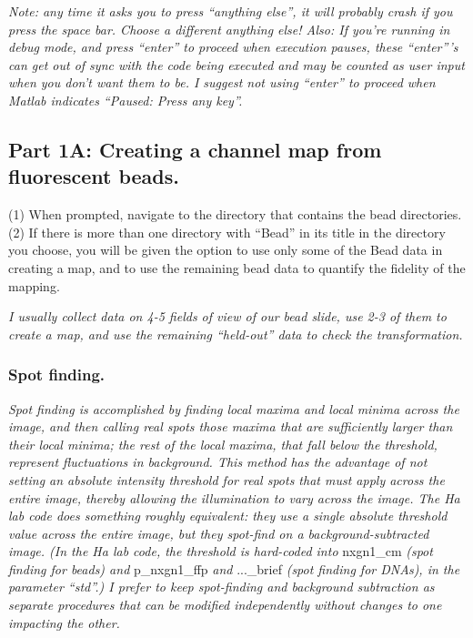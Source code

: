 \documentclass[11pt]{article}
\newcommand{\sj}[1]{\textcolor{red}{#1}}
\begin{document}
{\it Note: any time it asks you to press ``anything else'', it will probably crash if you press the space bar. Choose a different anything else!  Also: If you're running in debug mode, and press ``enter'' to proceed when execution pauses, these ``enter'''s can get out of sync with the code being executed and may be counted as user input when you don't want them to be.  I suggest not using ``enter'' to proceed when Matlab indicates ``Paused: Press any key''.}

\subsection{Part 1A: Creating a channel map from fluorescent beads.}

(1) When prompted, navigate to the directory that contains the bead directories. \\

\noindent (2) If there is more than one directory with ``Bead'' in its title in the directory you choose, you will be given the option to use only some of the Bead data in creating a map, and to use the remaining bead data to quantify the fidelity of the mapping. 

{\it I usually collect data on 4-5 fields of view of our bead slide, use 2-3 of them to create a map, and use the remaining ``held-out'' data to check the transformation. }%

\subsubsection{Spot finding.}\label{sec:SptFindBds}

{\it Spot finding is accomplished by finding local maxima and local minima across the image, and then calling real spots those maxima that are sufficiently larger than their local minima; the rest of the local maxima, that fall below the threshold, represent fluctuations in background.  This method has the advantage of not setting an absolute intensity threshold for real spots that must apply across the entire image, thereby allowing the illumination to vary across the image.  The Ha lab code does something roughly equivalent: they use a single absolute threshold value across the entire image, but they spot-find on a background-subtracted image. (In the Ha lab code, the threshold is hard-coded into} nxgn1\_cm {\it (spot finding for beads) and} p\_nxgn1\_ffp {\it and} ...\_brief {\it (spot finding for DNAs), in the parameter ``std''.) I prefer to keep spot-finding and background subtraction as separate procedures that can be modified independently without changes to one impacting the other.}\\
\end{document}
